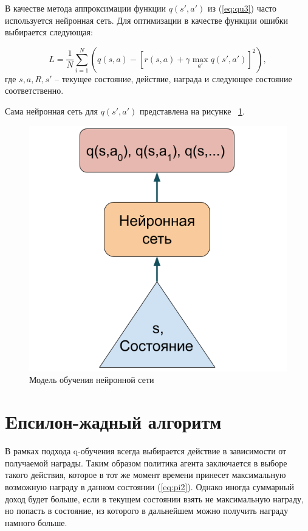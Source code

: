 В качестве метода аппроксимации функции $q(s', a')$ из (\ref{eq:qu3}) часто используется нейронная сеть. Для  оптимизации в качестве функции ошибки выбирается следующая:

$$L = \frac{1}{N} \sum\limits_{i=1}^N \left( q(s, a) - [r(s, a) + \gamma \max_{a'} q(s', a')]^2  \right),$$
где $s, a, R, s'$ -- текущее состояние, действие, награда и следующее состояние соответственно. 

Сама нейронная сеть для $q(s', a')$ представлена на рисунке ~\ref{fig:q-l}. 

\begin{figure}[h]
	\centering
	\includegraphics[scale=0.6]{q_l.png}
	\caption {Модель обучения нейронной сети}
	\label{fig:q-l}
\end{figure}
\newpage


\section{Eпсилон-жадный алгоритм}\label{1sec:optimal-control}

В рамках подхода q-обучения всегда выбирается действие в зависимости от получаемой награды. Таким образом политика агента заключается в выборе такого действия, которое в тот же момент времени принесет максимальную возможную награду в данном состоянии (\ref{eq:pi2}). Однако иногда суммарный доход будет больше, если в текущем состоянии взять не максимальную награду, но попасть в состояние, из которого в дальнейшем можно получить награду намного больше.

